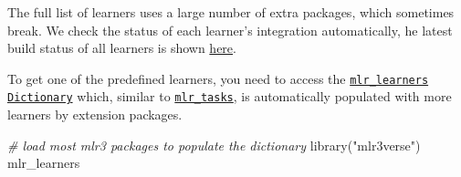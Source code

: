 \documentclass[
]{scrbook}
\newenvironment{Shaded}{\begin{snugshade}}{\end{snugshade}}
\newcommand{\CommentTok}[1]{\textcolor[rgb]{0.56,0.35,0.01}{\textit{#1}}}
\newcommand{\FunctionTok}[1]{\textcolor[rgb]{0.00,0.00,0.00}{#1}}
\newcommand{\NormalTok}[1]{#1}
\newcommand{\StringTok}[1]{\textcolor[rgb]{0.31,0.60,0.02}{#1}}
\renewenvironment{Shaded} {\begin{snugshade}\small} {\end{snugshade}}
\begin{document}
The full list of learners uses a large number of extra packages, which sometimes break.
We check the status of each learner's integration automatically, he latest build status of all learners is shown \href{https://mlr3extralearners.mlr-org.com/articles/learners/learner_status.html}{here}.

To get one of the predefined learners, you need to access the \href{https://mlr3.mlr-org.com/reference/mlr_learners.html}{\texttt{mlr\_learners}} \href{https://mlr3misc.mlr-org.com/reference/Dictionary.html}{\texttt{Dictionary}} which, similar to \href{https://mlr3.mlr-org.com/reference/mlr_tasks.html}{\texttt{mlr\_tasks}}, is automatically populated with more learners by extension packages.

\begin{Shaded}
\begin{Highlighting}[]
\CommentTok{\# load most mlr3 packages to populate the dictionary}
\FunctionTok{library}\NormalTok{(}\StringTok{"mlr3verse"}\NormalTok{)}
\NormalTok{mlr\_learners}
\end{Highlighting}
\end{Shaded}
\end{document}
